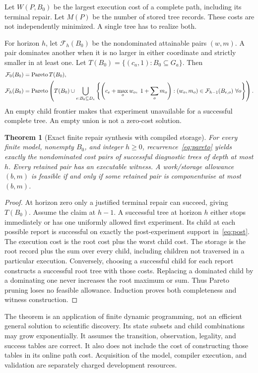 \documentclass[11pt,letterpaper]{article}
\theoremstyle{plain}
\newtheorem{theorem}{Theorem}[section]
\theoremstyle{definition}
\begin{document}
Let $W(P,B_0)$ be the largest execution cost of a complete path, including its terminal repair. Let $M(P)$ be the number of stored tree records. These costs are not independently minimized. A single tree has to realize both.

For horizon $h$, let $\mathcal F_h(B_0)$ be the nondominated attainable pairs $(w,m)$. A pair dominates another when it is no larger in either coordinate and strictly smaller in at least one. Let $T(B_0)=\{(c_a,1):B_0\subseteq G_a\}$. Then
\begin{align}\label{eq:pareto}
\mathcal F_0(B_0)&=\operatorname{Pareto} T(B_0),\\
\mathcal F_h(B_0)&=\operatorname{Pareto}\left(T(B_0)\cup
\bigcup_{e:B_0\subseteq D_e}
\left\{\left(c_e+\max_o w_o,\ 1+\sum_o m_o\right):
(w_o,m_o)\in\mathcal F_{h-1}(B_{e,o})\ \forall o\right\}\right).
\nonumber
\end{align}
An empty child frontier makes that experiment unavailable for a successful complete tree. An empty union is not a zero-cost solution.

\begin{theorem}[Exact finite repair synthesis with compiled storage]\label{thm:synthesis}
For every finite model, nonempty $B_0$, and integer $h\geq0$, recurrence~\eqref{eq:pareto} yields exactly the nondominated cost pairs of successful diagnostic trees of depth at most $h$. Every retained pair has an executable witness. A work/storage allowance $(b,m)$ is feasible if and only if some retained pair is componentwise at most $(b,m)$.
\end{theorem}
\begin{proof}
At horizon zero only a justified terminal repair can succeed, giving $T(B_0)$. Assume the claim at $h-1$. A successful tree at horizon $h$ either stops immediately or has one uniformly allowed first experiment. Its child at each possible report is successful on exactly the post-experiment support in~\eqref{eq:post}. The execution cost is the root cost plus the worst child cost. The storage is the root record plus the sum over every child, including children not traversed in a particular execution. Conversely, choosing a successful child for each report constructs a successful root tree with those costs. Replacing a dominated child by a dominating one never increases the root maximum or sum. Thus Pareto pruning loses no feasible allowance. Induction proves both completeness and witness construction.
\end{proof}

The theorem is an application of finite dynamic programming, not an efficient general solution to scientific discovery. Its state subsets and child combinations may grow exponentially. It assumes the transition, observation, legality, and success tables are correct. It also does not include the cost of constructing those tables in its online path cost. Acquisition of the model, compiler execution, and validation are separately charged development resources.
\end{document}
